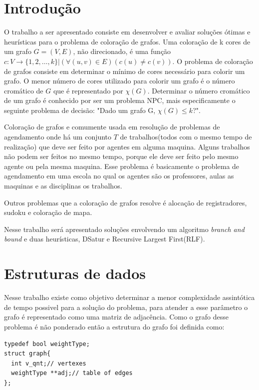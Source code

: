 \documentclass[12pt]{article}
\begin{document}
\section{Introdução}
\label{sec:org53f1ac5}
O trabalho a ser apresentado consiste em desenvolver e avaliar soluções ótimas e heurísticas para o problema de coloração de grafos. Uma coloração de k cores de um grafo \(G=(V,E)\), não direcionado, é uma função \(c:V \rightarrow \{1,2,\dots,k\} | (\forall (u,v) \in E) (c(u)\neq c(v))\). O problema de coloração de grafos consiste em determinar o mínimo de cores necessário para colorir um grafo. O menor número de cores utilizado para colorir um grafo é o número cromático de \(G\) que é representado por \(\chi(G)\). Determinar o número cromático de um grafo é conhecido por ser um problema NPC, mais especificamente o seguinte problema de decisão: "Dado um grafo G, \(\chi(G) \leq k\)?". \cite{stockmeyer73_planar_is_polyn_compl,karp72_reduc_combin_probl}

Coloração de grafos e comumente usada em resolução de problemas de agendamento onde há um conjunto \(T\) de trabalhos(todos com o mesmo tempo de realização) que deve ser feito por agentes em alguma maquina. Alguns trabalhos não podem ser feitos no mesmo tempo, porque ele deve ser feito pelo mesmo agente ou pela mesma maquina. Esse problema é basicamente o problema de agendamento em uma escola no qual os agentes são os professores, aulas as maquinas e as disciplinas os trabalhos. \cite{brelaz79_new_method_to_color_vertic_graph}

Outros problemas que a coloração de grafos resolve é alocação de registradores, sudoku e coloração de mapa.

Nesse trabalho será apresentado soluções envolvendo um algoritmo \emph{branch and bound} e duas heurísticas, DSatur e Recursive Largest First(RLF).

\section{Estruturas de dados}
\label{sec:orgf429f9d}

Nesse trabalho existe como objetivo determinar a menor complexidade assintótica de tempo possivel para a solução do problema, para atender a esse parâmetro o grafo é representado como uma matriz de adjacência. Como o grafo desse problema é não ponderado então a estrutura do grafo foi definida como:

\begin{verbatim}
typedef bool weightType;
struct graph{
  int v_qnt;// vertexes
  weightType **adj;// table of edges
};
\end{verbatim}
\end{document}
